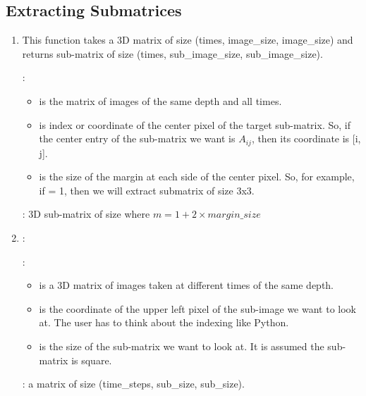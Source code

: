 \subsection{Extracting Submatrices}

\begin{enumerate}
\item {\small { }}

This function takes a 3D matrix of size {\small{(times, image\_size, image\_size)}} and returns sub-matrix of size {\small{(times, sub\_image\_size, sub\_image\_size)}}.

\textbf{}:

\begin{itemize}
\item {} is the matrix of images of the same depth and all times.
\item {} is index or coordinate of the center pixel of the target sub-matrix. So, if the center entry of the sub-matrix we want is $A_{ij}$, then its coordinate is [i, j].
\item {} is the size of the margin at each side of the center pixel. So, for example, if  = 1, then we will extract submatrix of size 3x3.
\end{itemize}
\textbf{}: 3D sub-matrix of size  where $m = 1+ 2\times margin\_size$

\vspace{.5in}
\item {}:

\textbf{}:
\begin{itemize}
\item {} is a 3D matrix of images taken at different times of the same depth.
\item {} is the coordinate of the upper left pixel of the sub-image  we want to look at. The user has to think about the indexing like Python.
\item {} is the size of the sub-matrix we want to look at. It is assumed the sub-matrix is square.
\end{itemize}

\textbf{}: a matrix of size (time\_steps, sub\_size, sub\_size).
\end{enumerate}

